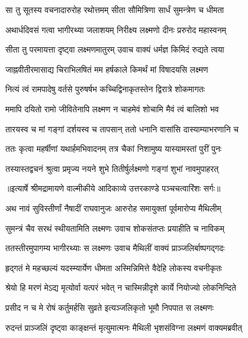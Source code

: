\twolineshloka
{सा तु सूतस्य वचनादारुरोह रथोत्तमम्}
{सीता सौमित्रिणा सार्धं सुमन्त्रेण च धीमता} %

\twolineshloka
{अथार्धदिवसं गत्वा भागीरथ्या जलाशयम्}
{निरीक्ष्य लक्ष्मणो दीनः प्ररुरोद महास्वनम्} %

\twolineshloka
{सीता तु परमायत्ता दृष्ट्वा लक्ष्मणमातुरम्}
{उवाच वाक्यं धर्मज्ञ किमिदं रुद्यते त्वया} %

\twolineshloka
{जाह्नवीतीरमासाद्य चिराभिलषितं मम}
{हर्षकाले किमर्थं मां विषादयसि लक्ष्मण} %

\twolineshloka
{नित्यं त्वं रामपादेषु वर्तसे पुरुषर्षभ}
{कच्चिद्विनाकृतस्तेन द्विरात्रे शोकमागतः} %

\twolineshloka
{ममापि दयितो रामो जीवितेनापि लक्ष्मण}
{न चाहमेवं शोचामि मैवं त्वं बालिशो भव} %

\twolineshloka
{तारयस्व च मां गङ्गां दर्शयस्व च तापसान्}
{ततो धनानि वासांसि दास्याम्याभरणानि च} %

\twolineshloka
{ततः कृत्वा महर्षीणां यथार्हमभिवादनम्}
{तत्र चैकां निशामुष्य यास्यामस्तां पुरीं पुनः} %

\twolineshloka
{तस्यास्तद्वचनं श्रुत्वा प्रमृज्य नयने शुभे}
{तितीर्षुर्लक्ष्मणो गङ्गां शुभां नावमुपाहरत्} %


{॥इत्यार्षे श्रीमद्रामायणे वाल्मीकीये आदिकाव्ये उत्तरकाण्डे पञ्चचत्वारिंशः सर्गः॥}


\twolineshloka
{अथ नावं सुविस्तीर्णां नैषादीं राघवानुजः}
{आरुरोह समायुक्तां पूर्वमारोप्य मैथिलीम्} %

\twolineshloka
{सुमन्त्रं चैव सरथं स्थीयतामिति लक्ष्मणः}
{उवाच शोकसंतप्तः प्रयाहीति च नाविकम्} %

\twolineshloka
{ततस्तीरमुपागम्य भागीरथ्याः स लक्ष्मणः}
{उवाच मैथिलीं वाक्यं प्राञ्जलिर्बाष्पगद्गदः} %

\twolineshloka
{हृद्गतं मे महच्छल्यं यदस्म्यार्येण धीमता}
{अस्मिन्निमित्ते वैदेहि लोकस्य वचनीकृतः} %

\twolineshloka
{श्रेयो हि मरणं मेऽद्य मृत्योर्वा यत्परं भवेत्}
{न चास्मिन्नीदृशे कार्ये नियोज्यो लोकनिन्दिते} %

\twolineshloka
{प्रसीद न च मे रोषं कर्तुमर्हसि सुव्रते}
{इत्यञ्जलिकृतो भूमौ निपपात स लक्ष्मणः} %

\twolineshloka
{रुदन्तं प्राञ्जलिं दृष्ट्वा काङ्क्षन्तं मृत्युमात्मनः}
{मैथिली भृशसंविग्ना लक्ष्मणं वाक्यमब्रवीत्} %

